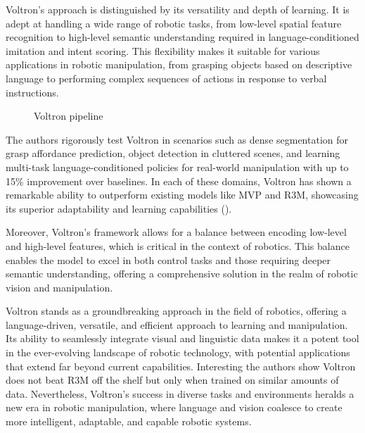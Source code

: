 \documentclass[
  letterpaper,
  numbers=noenddot,
  DIV=11,
  oneside]{scrreprt}
\theoremstyle{remark}
\begin{document}
Voltron's approach is distinguished by its versatility and depth of
learning. It is adept at handling a wide range of robotic tasks, from
low-level spatial feature recognition to high-level semantic
understanding required in language-conditioned imitation and intent
scoring. This flexibility makes it suitable for various applications in
robotic manipulation, from grasping objects based on descriptive
language to performing complex sequences of actions in response to
verbal instructions.

\begin{figure}


\caption{\label{fig-voltron-pipeline}Voltron pipeline}

\end{figure}%

The authors rigorously test Voltron in scenarios such as dense
segmentation for grasp affordance prediction, object detection in
cluttered scenes, and learning multi-task language-conditioned policies
for real-world manipulation with up to 15\% improvement over baselines.
In each of these domains, Voltron has shown a remarkable ability to
outperform existing models like MVP and R3M, showcasing its superior
adaptability and learning capabilities
().

Moreover, Voltron's framework allows for a balance between encoding
low-level and high-level features, which is critical in the context of
robotics. This balance enables the model to excel in both control tasks
and those requiring deeper semantic understanding, offering a
comprehensive solution in the realm of robotic vision and manipulation.

Voltron stands as a groundbreaking approach in the field of robotics,
offering a language-driven, versatile, and efficient approach to
learning and manipulation. Its ability to seamlessly integrate visual
and linguistic data makes it a potent tool in the ever-evolving
landscape of robotic technology, with potential applications that extend
far beyond current capabilities. Interesting the authors show Voltron
does not beat R3M off the shelf but only when trained on similar amounts
of data. Nevertheless, Voltron's success in diverse tasks and
environments heralds a new era in robotic manipulation, where language
and vision coalesce to create more intelligent, adaptable, and capable
robotic systems.
\end{document}
